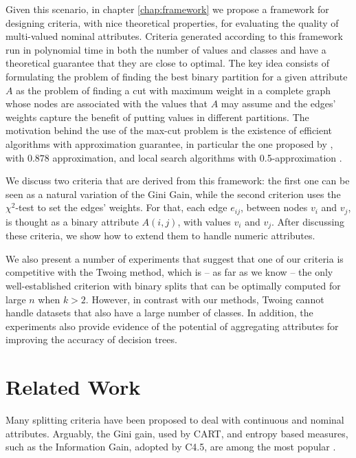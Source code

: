 Given this scenario,  in chapter \ref{chap:framework} we propose
a framework for designing criteria, with nice theoretical properties, for evaluating the quality of 
 multi-valued nominal attributes.
Criteria generated according to this framework
run in polynomial time in both the number of values and classes and
have a theoretical guarantee that they are close to optimal.
The key idea consists of formulating the problem
of finding the best binary partition for a given attribute $A$ as the  problem of finding a 
cut with maximum weight  in a complete graph whose nodes are associated with the values that $A$ may assume and the edges' weights capture the benefit of putting
values in different partitions. The  motivation behind the use of the max-cut problem is 
the existence of efficient algorithms with 
approximation guarantee, in particular 
the one proposed  by \cite{GoeWil95}, with $0.878$ approximation,
and  local search  algorithms with 0.5-approximation \cite{journals/corr/AngelBPW16}.


We discuss two criteria that are derived from this framework:
the first one  can be seen as a natural variation of the
Gini Gain, while the second criterion uses the $\chi^2$-test  to set the edges' weights. For that, each
edge $e_{ij}$, between nodes  $v_i$ and $v_j$,
is thought as a binary attribute $A(i,j)$, with values $v_i$ and $v_j$.
After discussing these criteria, we show how to extend them to handle
numeric attributes.

We also  present a number of experiments 
that suggest that one of our  criteria 
is  competitive with the Twoing method, which 
is -- as far as we know -- the only well-established
criterion with binary splits that can be optimally computed for large $n$ when $k > 2$.
However, in contrast with our methods, Twoing cannot handle
datasets that also have a large number of classes.
In addition, the experiments also  provide 
evidence of the potential of aggregating  attributes for improving
the accuracy of decision trees.

\chapter{Related Work}
\label{chap:relatedwork}

Many splitting criteria have been proposed to 
deal with continuous and nominal attributes.
Arguably, the Gini gain, used by CART,  and entropy based measures, such  as 
the Information Gain, adopted by C4.5, are among
the most popular \cite{books/sp/datamining2005/RokachM05,
Loh2014,series/sbcs/BarrosCF15}.

